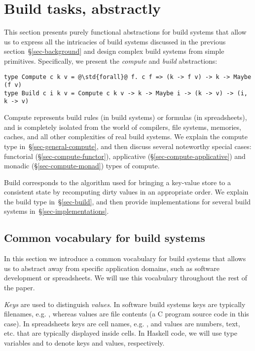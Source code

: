 \section{Build tasks, abstractly}\label{sec-compute}

This section presents purely functional abstractions for build systems that
allow us to express all the intricacies of build systems discussed in the
previous section~\S\ref{sec-background} and design complex build systems from
simple primitives. Specifically, we present the \emph{compute} and \emph{build}
abstractions:

\begin{verbatim}
type Compute c k v = @\std{forall}@ f. c f => (k -> f v) -> k -> Maybe (f v)
type Build c i k v = Compute c k v -> k -> Maybe i -> (k -> v) -> (i, k -> v)
\end{verbatim}

\noindent
Compute represents build rules (in build systems) or formulas (in spreadsheets),
and is completely isolated from the world of compilers, file systems, memories,
caches, and all other complexities of real build systems. We explain the compute
type in~\S\ref{sec-general-compute}, and then discuss several noteworthy special cases:
functorial (\S\ref{sec-compute-functor}), applicative
(\S\ref{sec-compute-applicative}) and monadic (\S\ref{sec-compute-monad}) types
of compute.

Build corresponds to the algorithm used for bringing a key-value store to a
consistent state by recomputing dirty values in an appropriate order. We explain
the build type in~\S\ref{sec-build}, and then provide implementations for several
build systems in~\S\ref{sec-implementations}.

\subsection{Common vocabulary for build systems}
\label{sec-vocabulary}

In this section we introduce a common vocabulary for build systems that allows
us to abstract away from specific application domains, such as software
development or spreadsheets. We will use this vocabulary throughout the rest of
the paper.

\emph{Keys} are used to distinguish \emph{values}. In software build systems
keys are typically filenames, e.g. , whereas values are file
contents (a C program source code in this case). In spreadsheets keys are cell
names, e.g. , and values are numbers, text, etc. that are typically
displayed inside cells. In Haskell code, we will use type variables 
and  to denote keys and values, respectively.

